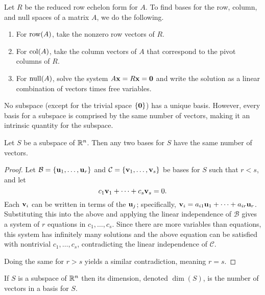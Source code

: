 \documentclass[../m073main.tex]{subfiles}
\begin{document}
\begin{theorem}
	Let $R$ be the reduced row echelon form for $A$.
	To find bases for the row, column, and null spaces of a matrix $A$, we do the following.
	\begin{enumerate}[label=(\alph*)]
		\item For $\textrm{row}(A)$, take the nonzero row vectors of $R$.
		\item For $\textrm{col}(A)$, take the column vectors of $A$ that correspond to the pivot columns of $R$.
		\item For $\textrm{null}(A)$, solve the system $A \mathbf{x} = R \mathbf{x} = \mathbf{0}$ and write the solution as a linear combination of vectors times free variables.
	\end{enumerate}
\end{theorem}

No subspace (except for the trivial space $\left\{ \mathbf{0} \right\}$) has a unique basis.
However, every basis for a subspace is comprised by the same number of vectors, making it an intrinsic quantity for the subspace.

\begin{theorem}
	Let $S$ be a subspace of $\mathbb{R}^n$.
	Then any two bases for $S$ have the same number of vectors.
\end{theorem}

\begin{proof}
	Let $\mathcal{B} = \left\{ \mathbf{u}_1, \ldots, \mathbf{u}_r \right\}$ and $\mathcal{C} = \left\{ \mathbf{v}_1, \ldots, \mathbf{v}_s \right\}$ be bases for $S$ such that $r < s$, and let
	\[ c_1 \mathbf{v}_1 + \cdots + c_s \mathbf{v}_s = 0. \]
	Each $\mathbf{v}_i$ can be written in terms of the $\mathbf{u}_j$; specifically, $\mathbf{v}_i = a_{i 1} \mathbf{u}_1 + \cdots + a_{i r} \mathbf{u}_r$.
	Substituting this into the above and applying the linear independence of $\mathcal{B}$ gives a system of $r$ equations in $c_1, \ldots, c_s$.
	Since there are more variables than equations, this system has infinitely many solutions and the above equation can be satisfied with nontrivial $c_1, \ldots, c_s$, contradicting the linear independence of $\mathcal{C}$.

	Doing the same for $r > s$ yields a similar contradiction, meaning $r = s$.
\end{proof}

\begin{definition}[Dimension]
	If $S$ is a subspace of $\mathbb{R}^n$ then its dimension, denoted $\dim (S)$, is the number of vectors in a basis for $S$.
\end{definition}
\end{document}
